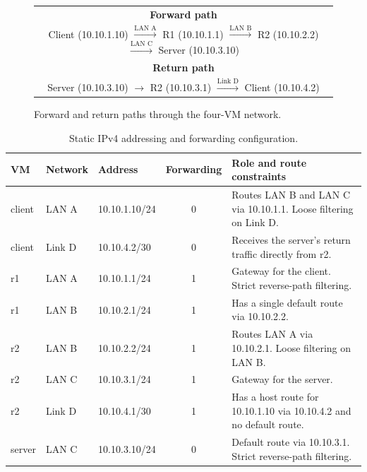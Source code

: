 \documentclass[12pt]{article}
\begin{document}
\begin{figure}[H]
    \centering
    \begin{tabular}{c}
        \textbf{Forward path}\\[3pt]
        Client (10.10.1.10)
        $\xrightarrow{\text{LAN A}}$
        R1 (10.10.1.1)
        $\xrightarrow{\text{LAN B}}$
        R2 (10.10.2.2)
        $\xrightarrow{\text{LAN C}}$
        Server (10.10.3.10)
        \\[10pt]
        \textbf{Return path}\\[3pt]
        Server (10.10.3.10)
        $\rightarrow$
        R2 (10.10.3.1)
        $\xrightarrow{\text{Link D}}$
        Client (10.10.4.2)
    \end{tabular}
    \caption{Forward and return paths through the four-VM network.}
    \label{fig:topology_diagram}
\end{figure}



\begin{table}[H]
    \centering
    \renewcommand{\arraystretch}{1.15}
    \setlength{\tabcolsep}{5pt}
    \begin{tabularx}{\textwidth}{@{} l l l c X @{}}
        \toprule
        \textbf{VM} & \textbf{Network} & \textbf{Address} &
        \textbf{Forwarding} & \textbf{Role and route constraints} \\
        \midrule
        client & LAN A & 10.10.1.10/24 & 0 &
        Routes LAN B and LAN C via 10.10.1.1. Loose filtering on Link D. \\
        client & Link D & 10.10.4.2/30 & 0 &
        Receives the server's return traffic directly from r2. \\
        r1 & LAN A & 10.10.1.1/24 & 1 &
        Gateway for the client. Strict reverse-path filtering. \\
        r1 & LAN B & 10.10.2.1/24 & 1 &
        Has a single default route via 10.10.2.2. \\
        r2 & LAN B & 10.10.2.2/24 & 1 &
        Routes LAN A via 10.10.2.1. Loose filtering on LAN B. \\
        r2 & LAN C & 10.10.3.1/24 & 1 &
        Gateway for the server. \\
        r2 & Link D & 10.10.4.1/30 & 1 &
        Has a host route for 10.10.1.10 via 10.10.4.2 and no default route. \\
        server & LAN C & 10.10.3.10/24 & 0 &
        Default route via 10.10.3.1. Strict reverse-path filtering. \\
        \bottomrule
    \end{tabularx}
    \caption{Static IPv4 addressing and forwarding configuration.}
    \label{tab:addressing_plan}
\end{table}
\end{document}

